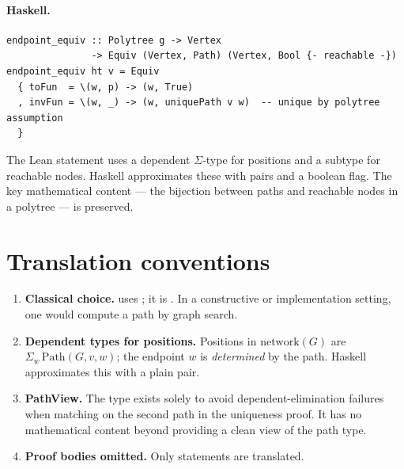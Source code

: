 \documentclass[11pt,a4paper]{article}
\begin{document}
\paragraph{Haskell.}
\begin{lstlisting}[style=haskell]
endpoint_equiv :: Polytree g -> Vertex
               -> Equiv (Vertex, Path) (Vertex, Bool {- reachable -})
endpoint_equiv ht v = Equiv
  { toFun  = \(w, p) -> (w, True)
  , invFun = \(w, _) -> (w, uniquePath v w)  -- unique by polytree assumption
  }
\end{lstlisting}

\begin{fidelitynote}
The Lean statement uses a dependent $\Sigma$-type for positions and a
subtype for reachable nodes.  Haskell approximates these with pairs and a
boolean flag.  The key mathematical content --- the bijection between paths
and reachable nodes in a polytree --- is preserved.
\end{fidelitynote}


\section{Translation conventions}

\begin{enumerate}
\item \textbf{Classical choice.}   uses
  ; it is .  In a constructive
  or implementation setting, one would compute a path by graph search.

\item \textbf{Dependent types for positions.}  Positions in
  $\mathrm{network}(G)$ are $\Sigma_{w}\,\mathrm{Path}(G, v, w)$; the
  endpoint $w$ is \emph{determined} by the path.  Haskell approximates this
  with a plain pair.

\item \textbf{PathView.}  The  type exists solely to avoid
  dependent-elimination failures when matching on the second path in the
  uniqueness proof.  It has no mathematical content beyond providing a clean
  view of the path type.

\item \textbf{Proof bodies omitted.}  Only statements are translated.
\end{enumerate}
\end{document}
